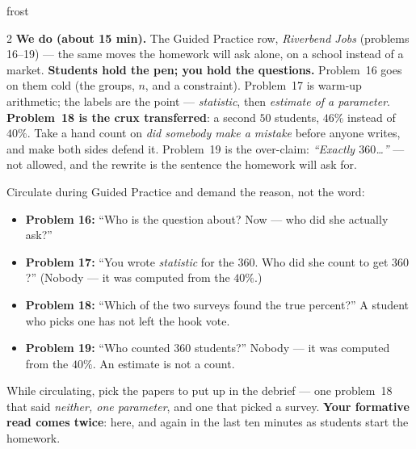 \documentclass[10pt]{article}
\begin{document}
\begin{skillbox}{frost}
\begin{multicols}{2}
\columnbreak
\textbf{We do (about 15 min).} The Guided Practice row, \emph{Riverbend Jobs} (problems
16--19) --- the same moves the homework will ask alone, on a school instead of a market.
\textbf{Students hold the pen; you hold the questions.} Problem~16 goes on them cold (the
groups, $n$, and a constraint). Problem~17 is warm-up arithmetic; the labels are the point ---
\emph{statistic}, then \emph{estimate of a parameter}. \textbf{Problem~18 is the crux
transferred}: a second $50$ students, $46\%$ instead of $40\%$. Take a hand count on \emph{did
somebody make a mistake} before anyone writes, and make both sides defend it. Problem~19 is the
over-claim: \emph{``Exactly $360$\ldots''} --- not allowed, and the rewrite is the sentence the
homework will ask for.

Circulate during Guided Practice and demand the reason, not the word:
\begin{itemize}[leftmargin=1.1em, nosep]
  \item \textbf{Problem 16:} ``Who is the question about? Now --- who did she actually ask?''
  \item \textbf{Problem 17:} ``You wrote \emph{statistic} for the $360$. Who did she count to
        get $360$?'' (Nobody --- it was computed from the $40\%$.)
  \item \textbf{Problem 18:} ``Which of the two surveys found the true percent?'' A student who
        picks one has not left the hook vote.
  \item \textbf{Problem 19:} ``Who counted $360$ students?'' Nobody --- it was computed from
        the $40\%$. An estimate is not a count.
\end{itemize}
While circulating, pick the papers to put up in the debrief --- one problem~18 that said
\emph{neither, one parameter}, and one that picked a survey. \textbf{Your formative read comes
twice}: here, and again in the last ten minutes as students start the homework.
\end{multicols}
\end{skillbox}
\end{document}
